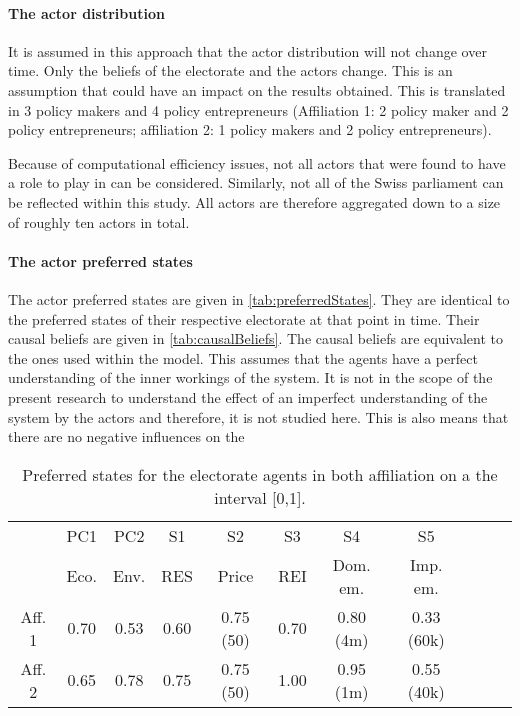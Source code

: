 \documentclass[12pt]{article}
\begin{document}
\paragraph{The actor distribution}

It is assumed in this approach that the actor distribution will not change over time. Only the beliefs of the electorate and the actors change. This is an assumption that could have an impact on the results obtained. This is translated in 3 policy makers and 4 policy entrepreneurs (Affiliation 1: 2 policy maker and 2 policy entrepreneurs; affiliation 2: 1 policy makers and 2 policy entrepreneurs).

Because of computational efficiency issues, not all actors that were found to have a role to play in \cite{markard2016socio} can be considered. Similarly, not all of the Swiss parliament can be reflected within this study. All actors are therefore aggregated down to a size of roughly ten actors in total. 

\paragraph{The actor preferred states} The actor preferred states are given in \autoref{tab:preferredStates}. They are identical to the preferred states of their respective electorate at that point in time. Their causal beliefs are given in \autoref{tab:causalBeliefs}. The causal beliefs are equivalent to the ones used within the model. This assumes that the agents have a perfect understanding of the inner workings of the system. It is not in the scope of the present research to understand the effect of an imperfect understanding of the system by the actors and therefore, it is not studied here. This is also means that there are no negative influences on the 

\begin{table}
\begin{center}
\begin{tabular}{ |c|c|c|c|c|c|c|c|c|c|c| } 
\hline
		
		& PC1 	& PC2	& S1		& S2			& S3		& S4			& S5		\\ 
		& Eco.	& Env.	& RES	& Price		& REI	& Dom. em.	& Imp. em.	\\ \hline \hline
Aff. 1		& 0.70	& 0.53	& 0.60	& 0.75 (50)	& 0.70	& 0.80 (4m)	& 0.33 (60k)	\\ \hline
Aff. 2		& 0.65	& 0.78	& 0.75	& 0.75 (50) 	& 1.00	& 0.95 (1m)	& 0.55 (40k)	\\ 
\hline
\end{tabular}
\end{center}
\caption{Preferred states for the electorate agents in both affiliation on a the interval [0,1].}
\label{tab:preferredStates}
\end{table}
\end{document}
